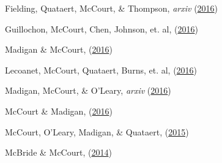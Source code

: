 \begin{pubnumerate}
%
\item Fielding, Quataert, McCourt, \& Thompson, \textit{arxiv} (\href{http://adsabs.harvard.edu/abs/2016arXiv160606734F}{2016})\\

\item Guillochon, McCourt, Chen, Johnson, et. al, \textit{\apj} (\href{http://adsabs.harvard.edu/abs/2016ApJ...822...48G}{2016})\\

\item Madigan \& McCourt, \textit{\mnras} (\href{http://adsabs.harvard.edu/abs/2016MNRAS.457L..89M}{2016})\\

\item Lecoanet, McCourt, Quataert, Burns, et. al, \textit{\mnras} (\href{http://adsabs.harvard.edu/abs/2016MNRAS.455.4274L}{2016})\\

\item Madigan, McCourt, \& O'Leary, \textit{arxiv} (\href{http://adsabs.harvard.edu/abs/2016arXiv160202760M}{2016})\\

\item McCourt \& Madigan, \textit{\mnras} (\href{http://adsabs.harvard.edu/abs/2016MNRAS.455.2187M}{2016})\\

\item McCourt, O'Leary, Madigan, \& Quataert, \textit{\mnras} (\href{http://adsabs.harvard.edu/abs/2015MNRAS.449....2M}{2015})\\

\item McBride \& McCourt, \textit{\mnras} (\href{http://adsabs.harvard.edu/abs/2014MNRAS.442..838M}{2014})\\


\end{pubnumerate}
